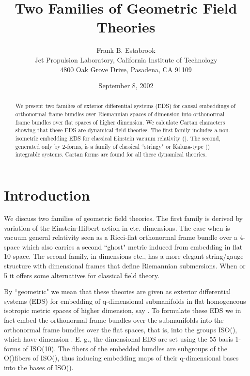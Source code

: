 \documentclass[a4paper,a4paper]{article}
\title{Two Families of Geometric Field Theories}
\author{Frank B. Estabrook \\
Jet Propulsion Laboratory,  California Institute of Technology \\
4800 Oak Grove Drive,  Pasadena,  CA 91109}
\date{September 8, 2002}
\begin{document}
\maketitle

\begin{abstract}

We present  two families of exterior differential systems (EDS) for
causal embeddings of orthonormal frame bundles over Riemannian spaces of
dimension \coordHE{} into orthonormal frame bundles over flat spaces
of higher dimension.  We calculate Cartan characters showing that these
EDS are dynamical field theories.  The first family includes a
non-isometric  embedding  EDS  for classical Einstein vacuum relativity
(\coordHE{}). The second, generated only by 2-forms, is a family of classical
``stringy" or Kaluza-type (\coordHE{}) integrable systems.  Cartan forms
are found for all these dynamical theories.
\end{abstract}

\section{Introduction}

        We discuss two families of geometric field theories.  The first
family is derived by variation of the Einstein-Hilbert action in \coordHE{} etc. dimensions.  The case when \coordHE{} is vacuum general relativity
seen as a Ricci-flat orthonormal frame bundle over a 4-space which also
carries a second ``ghost"  metric induced from embedding in flat 10-space.  The
second family,  in dimensions  \coordHE{} etc., has a more
elegant string/gauge structure with \coordHE{}dimensional frames that define
Riemannian submersions. When \coordHE{} or 5 it offers some alternatives
for classical field theory.

        By ``geometric" we mean that these theories are given as
exterior differential systems (EDS) for  embedding of q-dimensional
submanifolds \coordHE{} in flat homogeneous isotropic metric spaces \coordHE{} of higher
dimension,  say \coordHE{}. To formulate these EDS we in fact embed the
orthonormal frame bundles over the submanifolds into the orthonormal frame bundles over
the flat spaces,  that is,  into the groups ISO(\coordHE{}), which have
dimension \coordHE{}. E. g., the \coordHE{} dimensional EDS are set using the 55 basis
1-forms of ISO(10).  The fibers of the embedded bundles are subgroups of
the O(\coordHE{})fibers of ISO(\coordHE{}),  thus inducing embedding maps of their q-dimensional
bases \coordHE{} into the \coordHE{} bases of ISO(\coordHE{}).
\end{document}

